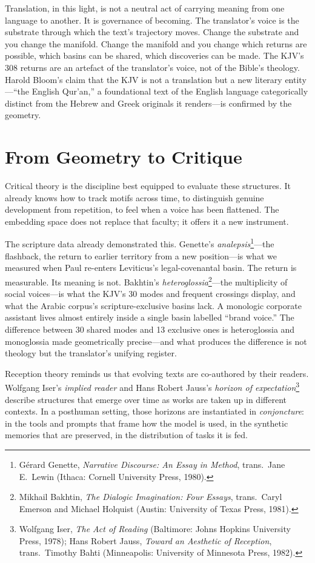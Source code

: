 Translation, in this light, is not a neutral act of carrying meaning from one language to another. It is governance of becoming. The translator's voice is the substrate through which the text's trajectory moves. Change the substrate and you change the manifold. Change the manifold and you change which returns are possible, which basins can be shared, which discoveries can be made. The KJV's 308 returns are an artefact of the translator's voice, not of the Bible's theology. Harold Bloom's claim that the KJV is not a translation but a new literary entity---``the English Qur'an,'' a foundational text of the English language categorically distinct from the Hebrew and Greek originals it renders---is confirmed by the geometry.


\section{From Geometry to Critique}

Critical theory is the discipline best equipped to evaluate these structures. It already knows how to track motifs across time, to distinguish genuine development from repetition, to feel when a voice has been flattened. The embedding space does not replace that faculty; it offers it a new instrument.

The scripture data already demonstrated this. Genette's \emph{analepsis}\footnote{G\'{e}rard Genette, \emph{Narrative Discourse: An Essay in Method}, trans.\ Jane E.\ Lewin (Ithaca: Cornell University Press, 1980).}---the flashback, the return to earlier territory from a new position---is what we measured when Paul re-enters Leviticus's legal-covenantal basin. The return is measurable. Its meaning is not. Bakhtin's \emph{heteroglossia}\footnote{Mikhail Bakhtin, \emph{The Dialogic Imagination: Four Essays}, trans.\ Caryl Emerson and Michael Holquist (Austin: University of Texas Press, 1981).}---the multiplicity of social voices---is what the KJV's 30 modes and frequent crossings display, and what the Arabic corpus's scripture-exclusive basins lack. A monologic corporate assistant lives almost entirely inside a single basin labelled ``brand voice.'' The difference between 30 shared modes and 13 exclusive ones is heteroglossia and monoglossia made geometrically precise---and what produces the difference is not theology but the translator's unifying register.

Reception theory reminds us that evolving texts are co-authored by their readers. Wolfgang Iser's \emph{implied reader} and Hans Robert Jauss's \emph{horizon of expectation}\footnote{Wolfgang Iser, \emph{The Act of Reading} (Baltimore: Johns Hopkins University Press, 1978); Hans Robert Jauss, \emph{Toward an Aesthetic of Reception}, trans.\ Timothy Bahti (Minneapolis: University of Minnesota Press, 1982).} describe structures that emerge over time as works are taken up in different contexts. In a posthuman setting, those horizons are instantiated in \emph{conjoncture}: in the tools and prompts that frame how the model is used, in the synthetic memories that are preserved, in the distribution of tasks it is fed.


